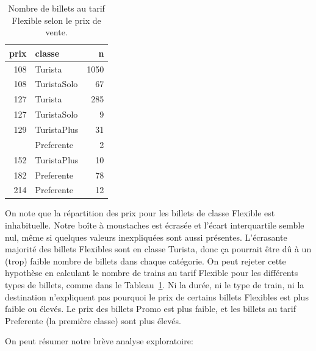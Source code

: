 \documentclass[
  11pt,
  letterpaper,
]{book}
\theoremstyle{definition}
\theoremstyle{remark}
\begin{document}
\hypertarget{tbl-renfeaedrep}{}
\begin{table}
\caption{\label{tbl-renfeaedrep}Nombre de billets au tarif Flexible selon le prix de vente. }\tabularnewline

\centering
\begin{tabular}[t]{rlr}
\toprule
prix & classe & n\\
\midrule
108 & Turista & 1050\\
108 & TuristaSolo & 67\\
127 & Turista & 285\\
127 & TuristaSolo & 9\\
129 & TuristaPlus & 31\\
\addlinespace
140 & Preferente & 2\\
152 & TuristaPlus & 10\\
182 & Preferente & 78\\
214 & Preferente & 12\\
\bottomrule
\end{tabular}
\end{table}

On note que la répartition des prix pour les billets de classe Flexible
est inhabituelle. Notre boîte à moustaches est écrasée et l'écart
interquartile semble nul, même si quelques valeurs inexpliquées sont
aussi présentes. L'écrasante majorité des billets Flexibles sont en
classe Turista, donc ça pourrait être dû à un (trop) faible nombre de
billets dans chaque catégorie. On peut rejeter cette hypothèse en
calculant le nombre de trains au tarif Flexible pour les différents
types de billets, comme dans le Tableau~\ref{tbl-renfeaedrep}. Ni la
durée, ni le type de train, ni la destination n'expliquent pas pourquoi
le prix de certains billets Flexibles est plus faible ou élevés. Le prix
des billets Promo est plus faible, et les billets au tarif Preferente
(la première classe) sont plus élevés.

On peut résumer notre brève analyse exploratoire:
\end{document}
